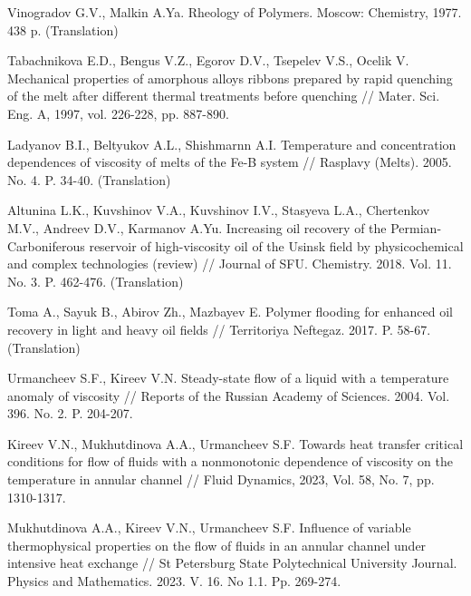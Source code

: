 \documentclass[12pt]{llncs}
\begin{document}
\begin{thebibliography}{99} %

 Vinogradov G.V., Malkin A.Ya. Rheology of Polymers. Moscow: Chemistry, 1977. 438 p. (Translation)

 Tabachnikova E.D., Bengus V.Z., Egorov D.V., Tsepelev V.S., Ocelik V. Mechanical properties of amorphous alloys ribbons prepared by rapid quenching of the melt after different thermal treatments before quenching // Mater. Sci. Eng. A, 1997, vol. 226-228, pp. 887-890.

 Ladyanov B.I., Beltyukov A.L., Shishmarnn A.I. Temperature and concentration dependences of viscosity of melts of the Fe-B system // Rasplavy (Melts). 2005. No. 4. P. 34-40. (Translation)

 Altunina L.K., Kuvshinov V.A., Kuvshinov I.V., Stasyeva L.A., Chertenkov M.V., Andreev D.V., Karmanov A.Yu. Increasing oil recovery of the Permian-Carboniferous reservoir of high-viscosity oil of the Usinsk field by physicochemical and complex technologies (review) // Journal of SFU. Chemistry. 2018. Vol. 11. No. 3. P. 462-476. (Translation)

 Toma A., Sayuk B., Abirov Zh., Mazbayev E. Polymer flooding for enhanced oil recovery in light and heavy oil fields // Territoriya Neftegaz. 2017. P. 58-67. (Translation)

 Urmancheev S.F., Kireev V.N. Steady-state flow of a liquid with a temperature anomaly of viscosity // Reports of the Russian Academy of Sciences. 2004. Vol. 396. No. 2. P. 204-207. 

 Kireev V.N., Mukhutdinova A.A., Urmancheev S.F. Towards heat transfer critical conditions for flow of fluids with a nonmonotonic dependence of viscosity on the temperature in annular channel // Fluid Dynamics, 2023, Vol. 58, No. 7, pp. 1310-1317.

 Mukhutdinova A.A., Kireev V.N., Urmancheev S.F. Influence of variable thermophysical properties on the flow of fluids in an annular channel under intensive heat exchange // St Petersburg State Polytechnical University Journal. Physics and Mathematics. 2023. V. 16. No 1.1. Pp. 269-274.

\end{thebibliography}


\end{document}
